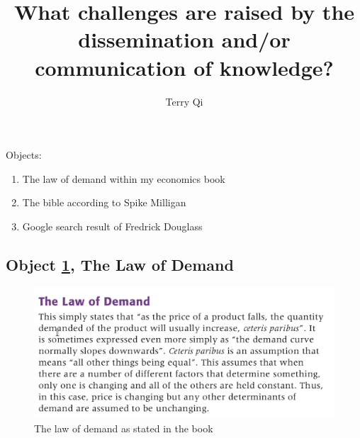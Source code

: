 \documentclass[a4paper,11pt]{article}
\title{What challenges are raised by the dissemination and/or communication of knowledge?}
\author{Terry Qi}
\begin{document}
\maketitle

Objects:
\begin{enumerate}
 \item The law of demand within my economics book
 \item The bible according to Spike Milligan
 \item Google search result of Fredrick Douglass
\end{enumerate}

\newpage




\subsection*{Object \ref{fig:lod}, The Law of Demand}

\begin{figure}[h!]
 \centering
 \includegraphics[scale=0.3]{ecobook.png}
 \caption{The law of demand as stated in the book}
 \label{fig:lod}
\end{figure}
\end{document}
